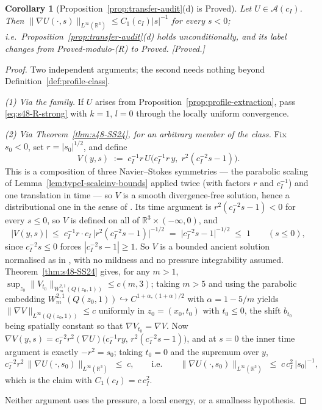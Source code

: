 \documentclass[11pt]{article}
\newtheorem{corollary}[theorem]{Corollary}
\theoremstyle{definition}
\theoremstyle{remark}
\newcommand{\R}{\mathbb{R}}
\begin{document}
\begin{corollary}[Proposition~\ref{prop:transfer-audit}(d) is Proved]
  \label{cor:s48-transfer-d}
  Let $U\in\mathcal{A}(c_I)$. Then
  $\|\nabla U(\cdot,s)\|_{L^\infty(\R^3)}\leq C_1(c_I)|s|^{-1}$ for every
  $s<0$; i.e.\ Proposition~\ref{prop:transfer-audit}(d) holds unconditionally,
  and its label changes from \emph{Proved-modulo-(R)} to \emph{Proved}.
  \emph{[Proved.]}
\end{corollary}
\begin{proof}
  Two independent arguments; the second needs nothing beyond
  Definition~\ref{def:profile-class}.

  \emph{(1) Via the family.} If $U$ arises from
  Proposition~\ref{prop:profile-extraction}, pass \eqref{eq:s48-R-strong}
  with $k=1$, $l=0$ through the locally uniform convergence.

  \emph{(2) Via Theorem~\ref{thm:s48-SS24}, for an arbitrary member of the
  class.} Fix $s_0<0$, set $r=|s_0|^{1/2}$, and define
  \[
    V(y,s) \;:=\; c_I^{-1}r\,
      U\bigl(c_I^{-1}r\,y,\; r^2(c_I^{-2}s-1)\bigr) .
  \]
  This is a composition of three Navier--Stokes symmetries --- the parabolic
  scaling of Lemma~\ref{lem:typeI-scaleinv-bounds} applied twice (with factors
  $r$ and $c_I^{-1}$) and one translation in time --- so $V$ is a smooth
  divergence-free solution, hence a distributional one in the sense of
  \cite[Def.~2.1]{SereginSverak2009}. Its time argument is
  $r^2(c_I^{-2}s-1)<0$ for every $s\leq0$, so $V$ is defined on all of
  $\R^3\times(-\infty,0)$, and
  \[
    |V(y,s)| \;\leq\; c_I^{-1}r\cdot c_I\,
      \bigl|r^2(c_I^{-2}s-1)\bigr|^{-1/2}
    \;=\; \bigl|c_I^{-2}s-1\bigr|^{-1/2} \;\leq\; 1
    \qquad (s\leq0),
  \]
  since $c_I^{-2}s\leq0$ forces $|c_I^{-2}s-1|\geq1$. So $V$ is a bounded
  ancient solution normalised as in \cite[(4.8)]{SereginSverak2009}, with no
  mildness and no pressure integrability assumed.
  Theorem~\ref{thm:s48-SS24} gives, for any $m>1$,
  $\sup_{z_0}\|V_{t_0}\|_{W^{2,1}_m(Q(z_0,1))}\leq c(m,3)$; taking $m>5$ and
  using the parabolic embedding
  $W^{2,1}_m(Q(z_0,1))\hookrightarrow C^{1+\alpha,(1+\alpha)/2}$ with
  $\alpha=1-5/m$ yields $\|\nabla V\|_{L^\infty(Q(z_0,1))}\leq c$ uniformly in
  $z_0=(x_0,t_0)$ with $t_0\leq0$, the shift $b_{t_0}$ being spatially
  constant so that $\nabla V_{t_0}=\nabla V$. Now
  $\nabla V(y,s)=c_I^{-2}r^2(\nabla U)\bigl(c_I^{-1}ry,\,
  r^2(c_I^{-2}s-1)\bigr)$, and at $s=0$ the inner time argument is exactly
  $-r^2=s_0$; taking $t_0=0$ and the supremum over $y$,
  \[
    c_I^{-2}r^{2}\,\|\nabla U(\cdot,s_0)\|_{L^\infty(\R^3)} \;\leq\; c,
    \qquad\text{i.e.}\qquad
    \|\nabla U(\cdot,s_0)\|_{L^\infty(\R^3)} \;\leq\; c\,c_I^{2}\,|s_0|^{-1},
  \]
  which is the claim with $C_1(c_I)=c\,c_I^2$.

  Neither argument uses the pressure, a local energy, or a smallness
  hypothesis.
\end{proof}
\end{document}
